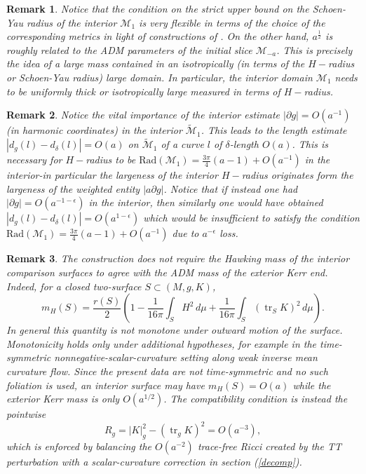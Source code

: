 \documentclass{amsart}
\newtheorem{remark}{Remark}
\begin{document}
\begin{remark}
 Notice that the condition on the strict upper bound on the Schoen-Yau radius of the interior $\mathcal{M}_{1}$ is very flexible in terms of the choice of the corresponding metrics in light of constructions of \cite{yau}. On the other hand, $a^{\frac{1}{2}}$ is roughly related to the ADM parameters of the initial slice $\mathcal{M}_{-a}$. This is precisely the idea of a large mass contained in an isotropically (in terms of the $H-$radius or Schoen-Yau radius) large domain. In particular, the interior domain $\mathcal{M}_{1}$ needs to be uniformly thick or isotropically large measured in terms of $H-$radius.    
\end{remark}


\begin{remark}
Notice the vital importance of the interior estimate $|\partial g|=O(a^{-1})$ (in harmonic coordinates) in the interior $\widetilde{\mathcal{M}}_{1}$. This leads to the length estimate $|d_{g}(l)-d_{\delta}(l)|=O(a)$ on $\widetilde{\mathcal{M}}_{1}$ of a curve $l$ of $\delta$-length $O(a)$. This is necessary for $H-$radius to be $\text{Rad}(\mathcal{M}_{1})=\frac{3\pi}{4}(a-1)+O(a^{-1})$ in the interior-in particular the largeness of the interior $H-$radius originates form the largeness of the weighted entity $|a\partial g|$. Notice that if instead one had $|\partial g|=O(a^{-1-\epsilon})$ in the interior, then similarly one would have obtained $|d_{g}(l)-d_{\delta}(l)|=O(a^{1-\epsilon})$ which would be insufficient to satisfy the condition $\text{Rad}(\mathcal{M}_{1})=\frac{3\pi}{4}(a-1)+O(a^{-1})$ due to $a^{-\epsilon}$ loss. 
\end{remark}

\begin{remark}
The construction does not require the Hawking mass of the interior
comparison surfaces to agree with the ADM mass of the exterior Kerr end.
Indeed, for a closed two-surface \(S\subset (M,g,K)\),
\[
        m_H(S)
        =
        \frac{r(S)}2
        \left(
        1
        -
        \frac1{16\pi}\int_S H^2\,d\mu
        +
        \frac1{16\pi}\int_S(\operatorname{tr}_S K)^2\,d\mu
        \right).
\]
In general this quantity is not monotone under outward motion of the
surface. Monotonicity holds only under additional hypotheses, for
example in the time-symmetric nonnegative-scalar-curvature setting
along weak inverse mean curvature flow. Since the present data are not
time-symmetric and no such foliation is used, an interior surface may
have \(m_H(S)=O(a)\) while the exterior Kerr mass is only
\(O(a^{1/2})\). The compatibility condition is instead the pointwise
\[
        R_g=|K|_g^2-(\operatorname{tr}_gK)^2=O(a^{-3}),
\]
which is enforced by balancing the \(O(a^{-2})\) trace-free Ricci
created by the TT perturbation with a scalar-curvature correction in section (\ref{decomp}).
\end{remark}
\end{document}
